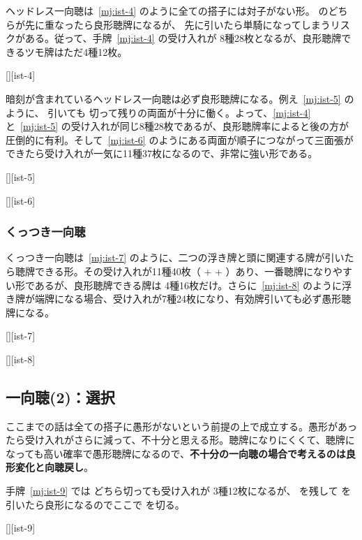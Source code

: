 \documentclass[../nankiru_main.tex]{subfiles}
\begin{document}
ヘッドレス一向聴は~\ref{mj:ist-4} のように全ての搭子には対子がない形。 のどちらが先に重なったら良形聴牌になるが、 先に引いたら単騎になってしまうリスクがある。従って、手牌~\ref{mj:ist-4} の受け入れが  8種28枚となるが、良形聴牌できるツモ牌はただ4種12枚。

[][ist-4]

暗刻が含まれているヘッドレス一向聴は必ず良形聴牌になる。例え~\ref{mj:ist-5} のように、 引いても  切って残りの両面が十分に働く。よって、\ref{mj:ist-4} と~\ref{mj:ist-5} の受け入れが同じ8種28枚であるが、良形聴牌率によると後の方が圧倒的に有利。そして~\ref{mj:ist-6} のようにある両面が順子につながって三面張ができたら受け入れが一気に11種37枚になるので、非常に強い形である。

[][ist-5]

[][ist-6]


\subsubsection*{くっつき一向聴}

くっつき一向聴は~\ref{mj:ist-7} のように、二つの浮き牌と頭に関連する牌が引いたら聴牌できる形。その受け入れが11種40枚（ +  + ）あり、一番聴牌になりやすい形であるが、良形聴牌できる牌は  4種16枚だけ。さらに~\ref{mj:ist-8} のように浮き牌が端牌になる場合、受け入れが7種24枚になり、有効牌引いても必ず愚形聴牌になる。

[][ist-7]

[][ist-8]

\subsection{一向聴(2)：選択}

ここまでの話は全ての搭子に愚形がないという前提の上で成立する。愚形があったら受け入れがさらに減って、不十分と思える形。聴牌になりにくくて、聴牌になっても高い確率で愚形聴牌になるので、\textbf{不十分の一向聴の場合で考えるのは良形変化と向聴戻し}\citep{manboo-iishanten}。

手牌~\ref{mj:ist-9} では  どちら切っても受け入れが  3種12枚になるが、 を残して  を引いたら良形になるのでここで  を切る。

[][ist-9]
\end{document}
